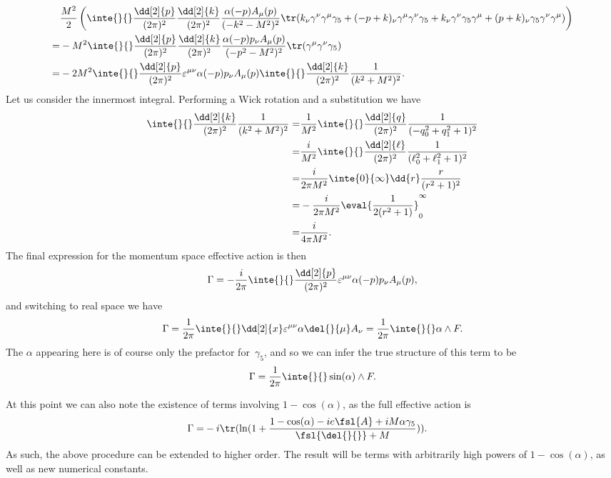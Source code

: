 \begin{align*}
	 &\frac{M^{2}}{2}\left(\inte{}{}\frac{\dd[2]{p}}{(2\pi)^{2}}\frac{\dd[2]{k}}{(2\pi)^{2}}\frac{\alpha(-p)A_{\mu}(p)}{(-k^{2} - M^{2})^{2}}\tr(k_{\nu}\gamma^{\nu}\gamma^{\mu}\gamma_{5} + (-p + k)_{\nu}\gamma^{\mu}\gamma^{\nu}\gamma_{5} + k_{\nu}\gamma^{\nu}\gamma_{5}\gamma^{\mu} + (p + k)_{\nu}\gamma_{5}\gamma^{\nu}\gamma^{\mu})\right) \\
	=& -M^{2}\inte{}{}\frac{\dd[2]{p}}{(2\pi)^{2}}\frac{\dd[2]{k}}{(2\pi)^{2}}\frac{\alpha(-p)p_{\nu}A_{\mu}(p)}{(-p^{2} - M^{2})^{2}}\tr(\gamma^{\mu}\gamma^{\nu}\gamma_{5}) \\
	=& -2M^{2}\inte{}{}\frac{\dd[2]{p}}{(2\pi)^{2}}\varepsilon^{\mu\nu}\alpha(-p)p_{\nu}A_{\mu}(p)\inte{}{}\frac{\dd[2]{k}}{(2\pi)^{2}}\frac{1}{(k^{2} + M^{2})^{2}}.
\end{align*}
Let us consider the innermost integral. Performing a Wick rotation and a substitution we have
\begin{align*}
	\inte{}{}\frac{\dd[2]{k}}{(2\pi)^{2}}\frac{1}{(k^{2} + M^{2})^{2}} =& \frac{1}{M^{2}}\inte{}{}\frac{\dd[2]{q}}{(2\pi)^{2}}\frac{1}{(-q_{0}^{2} + q_{1}^{2} + 1)^{2}} \\
	=& \frac{i}{M^{2}}\inte{}{}\frac{\dd[2]{\ell}}{(2\pi)^{2}}\frac{1}{(\ell_{0}^{2} + \ell_{1}^{2} + 1)^{2}} \\
	=& \frac{i}{2\pi M^{2}}\inte{0}{\infty}\dd{r}\frac{r}{(r^{2} + 1)^{2}} \\
	=& -\frac{i}{2\pi M^{2}}\eval{\frac{1}{2(r^{2} + 1)}}_{0}^{\infty} \\
	=& \frac{i}{4\pi M^{2}}.
\end{align*}
The final expression for the momentum space effective action is then
\begin{align*}
	\Gamma = -\frac{i}{2\pi}\inte{}{}\frac{\dd[2]{p}}{(2\pi)^{2}}\varepsilon^{\mu\nu}\alpha(-p)p_{\nu}A_{\mu}(p),
\end{align*}
and switching to real space we have
\begin{align*}
	\Gamma = \frac{1}{2\pi}\inte{}{}\dd[2]{x}\varepsilon^{\mu\nu}\alpha\del{}{\mu}A_{\nu} = \frac{1}{2\pi}\inte{}{}\alpha\wedge F.
\end{align*}
The $\alpha$ appearing here is of course only the prefactor for $\gamma_{5}$, and so we can infer the true structure of this term to be
\begin{align*}
	\Gamma = \frac{1}{2\pi}\inte{}{}\sin(\alpha)\wedge F.
\end{align*}

At this point we can also note the existence of terms involving $1 - \cos(\alpha)$, as the full effective action is
\begin{align*}
	\Gamma =& - i\tr(\ln(1 + \frac{1 - \cos(\alpha) - ie\fsl{A} + iM\alpha\gamma_{5}}{\fsl{\del{}{}} + M})).
\end{align*}
As such, the above procedure can be extended to higher order. The result will be terms with arbitrarily high powers of $1 - \cos(\alpha)$, as well as new numerical constants.

